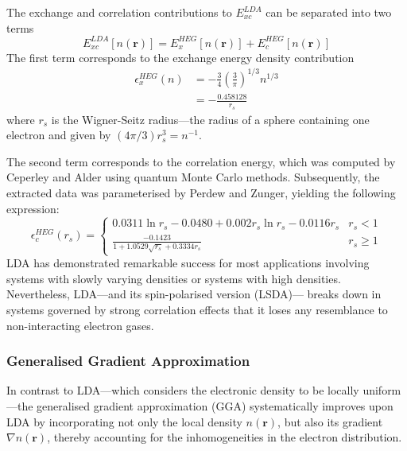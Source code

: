 The exchange and correlation contributions to $E_{xc}^{LDA}$ can be separated into two terms 
\begin{equation}
  \label{eq59}
  E_{xc}^{LDA}[n(\mathbf{r})] = E_x^{HEG}[n(\mathbf{r})] + E_c^{HEG}[n(\mathbf{r})]
\end{equation}
The first term corresponds to the exchange energy density contribution
\begin{equation}
  \label{eq60}
  \begin{aligned}
    \epsilon_x^{HEG}(n) &= -\frac{3}{4} \left(\frac{3}{\pi}\right)^{1/3} n^{1/3}\\
    &= -\frac{0.458128}{r_s}
  \end{aligned}
\end{equation}
where $r_s$ is the Wigner-Seitz radius---the radius of a sphere containing one electron and given by $(4\pi/3)r_s^3 = n^{-1}$.

The second term corresponds to the correlation energy, which was computed by Ceperley and Alder\supercite{Ceperley1980} using quantum Monte Carlo methods. Subsequently, the extracted data was parameterised by Perdew and Zunger\supercite{Perdew1981}, yielding the following expression:
\begin{equation}
  \label{eq61}
  \epsilon_c^{HEG}(r_s) = \begin{cases} 
    0.0311\ln{r_s} - 0.0480 + 0.002 r_s \ln{r_s} - 0.0116 r_s& r_s < 1\\
   \displaystyle \frac{-0.1423}{1 + 1.0529\sqrt{r_s} + 0.3334 r_s}& r_s \geq 1
  \end{cases}
\end{equation}
LDA has demonstrated remarkable success for most applications involving systems with slowly varying densities or systems with high densities. Nevertheless, LDA---and its spin-polarised version (LSDA)---
breaks down in systems governed by strong correlation effects that it loses any resemblance to non-interacting electron gases.   

\subsubsection{Generalised Gradient Approximation}
In contrast to LDA---which considers the electronic density to be locally uniform---the generalised gradient approximation (GGA) systematically improves upon LDA by incorporating not only the local density $n(\mathbf{r})$, but also its gradient $\nabla n(\mathbf{r})$, thereby accounting for the inhomogeneities in the electron distribution.  

